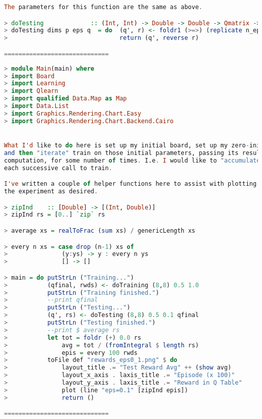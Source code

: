 \documentclass[12pt,a4paper]{article}
\begin{document}
\begin{lstlisting}[language=Haskell,numbers=none,basicstyle=\tiny]
The parameters for this function are the same as above.

> doTesting             :: (Int, Int) -> Double -> Double -> Qmatrix -> IO (Qmatrix, [Double])
> doTesting dims p eps q  = do  (q', r) <- foldr1 (>=>) (replicate n_episodes (testEpisode dims p n_steps eps)) (q, [0.0])
>                               return (q', reverse r)

=============================
	\end{lstlisting}

	\begin{lstlisting}[language=Haskell,numbers=none,basicstyle=\tiny]
> module Main(main) where
> import Board
> import Learning
> import Qlearn
> import qualified Data.Map as Map
> import Data.List
> import Graphics.Rendering.Chart.Easy
> import Graphics.Rendering.Chart.Backend.Cairo


What I'd like to do here is set up my initial board, set up my zero-initialized Qmatrix, 
and then "iterate" train on those initial parameters, passing its results into the next
computation, for some number of times. I.e. I would like to "accumulate" the results of
each successive call to train.

I've written a couple of helper functions here to assist with plotting the results of 
the experiment as desired.

> zipInd    :: [Double] -> [(Int, Double)]
> zipInd rs = [0..] `zip` rs

> average xs = realToFrac (sum xs) / genericLength xs

> every n xs = case drop (n-1) xs of
>               (y:ys) -> y : every n ys
>               [] -> []

> main = do putStrLn ("Training...")
>           (qfinal, rwds) <- doTraining (8,8) 0.5 1.0
>           putStrLn ("Training finished.")
>           --print qfinal
>           putStrLn ("Testing...")
>           (q', rs) <- doTesting (8,8) 0.5 0.1 qfinal
>           putStrLn ("Testing finished.")
>           --print $ average rs
>           let tot = foldr (+) 0.0 rs
>               avg = tot / (fromIntegral $ length rs)
>               epis = every 100 rwds
>           toFile def "rewards_eps0_1.png" $ do
>               layout_title .= "Test Reward Avg" ++ (show avg)
>               layout_x_axis . laxis_title .= "Episode (x 100)"
>               layout_y_axis . laxis_title .= "Reward in Q Table"
>               plot (line "eps=0.1" [zipInd epis])
>               return ()

=============================
	\end{lstlisting}
\end{document}
